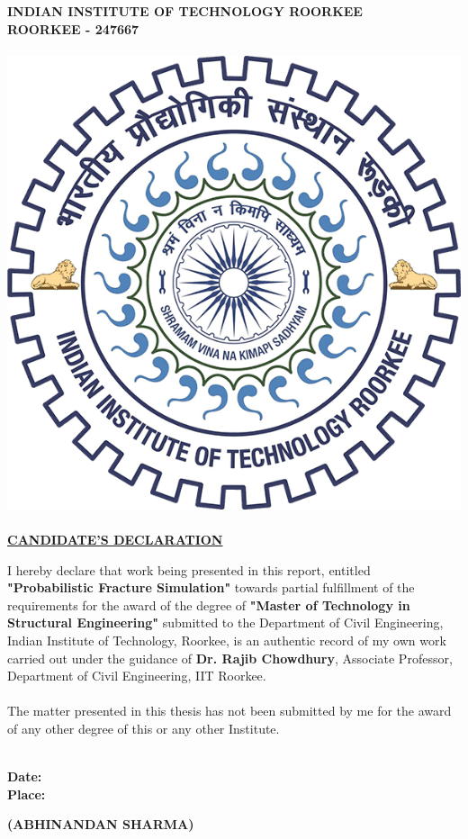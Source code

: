 \documentclass[12pt]{article}
\begin{document}
{%
\begin{center}
\textbf{ \LARGE   INDIAN INSTITUTE OF TECHNOLOGY ROORKEE\\
ROORKEE - 247667\\~\\
\includegraphics[width=.3\textwidth]{iitr.png}\\~\\
\underline{CANDIDATE'S DECLARATION}\\}
\end{center}
\begin{doublespace}
    {\large I hereby declare that work being presented 
    in this report, entitled \textbf{\large "Probabilistic 
    Fracture Simulation"} 
    towards partial fulfillment of the requirements for the 
    award of the degree of \textbf{\large "Master of Technology in Structural Engineering"}
    submitted to
    the Department of Civil Engineering, 
    Indian Institute of Technology, Roorkee, is an authentic
    record of my own work carried out under the 
    guidance of \textbf{Dr. Rajib Chowdhury}, Associate
    Professor, Department of Civil Engineering, IIT Roorkee.\\~\\
    The matter presented in this thesis has 
    not been submitted by me for the award of any other
    degree of this or any other Institute. \\~\\
    }    
\end{doublespace}
\begin{minipage}[t]{7cm}\bf
\flushleft
Date:\\Place:\\
\end{minipage}
\hfill
\begin{minipage}[t]{7cm}\bf
\flushright
(ABHINANDAN SHARMA)\\
\end{minipage}
\\~\\
\begin{center}\bf

\end{center}}
\end{document}
